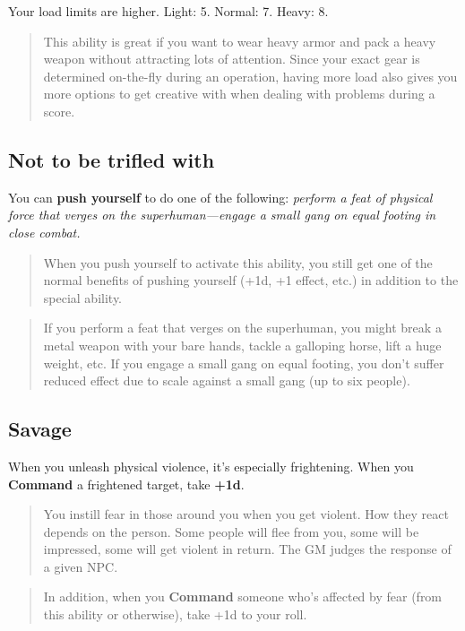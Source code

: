 \documentclass[11pt,oneside]{book}
\newcommand{\gameterm}[1]{\textbf{#1}}
\begin{document}
Your load limits are higher. Light: 5. Normal: 7. Heavy: 8.

\begin{quote}
	This ability is great if you want to wear heavy armor and pack a heavy weapon without attracting lots of attention. Since your exact gear is determined on-the-fly during an operation, having more load also gives you more options to get creative with when dealing with problems during a score.
\end{quote} 

\subsection{Not to be trifled with}

You can \textbf{push yourself} to do one of the following: \emph{perform a feat of physical force that verges on the superhuman---engage a small gang on equal footing in close combat.}

\begin{quote}
	When you push yourself to activate this ability, you still get one of the normal benefits of pushing yourself (+1d, +1 effect, etc.) in addition to the special ability.
\end{quote} 

\begin{quote}
	If you perform a feat that verges on the superhuman, you might break a metal weapon with your bare hands, tackle a galloping horse, lift a huge weight, etc. If you engage a small gang on equal footing, you don’t suffer reduced effect due to scale against a small gang (up to six people).
\end{quote} 

\subsection{Savage}

When you unleash physical violence, it’s especially frightening. When you \gameterm{Command}  a frightened target, take \textbf{+1d}.

\begin{quote}
	You instill fear in those around you when you get violent. How they react depends on the person. Some people will flee from you, some will be impressed, some will get violent in return. The GM judges the response of a given NPC.
\end{quote} 

\begin{quote}
	In addition, when you \gameterm{Command}  someone who’s affected by fear (from this ability or otherwise), take +1d to your roll.
\end{quote} 
\end{document}
